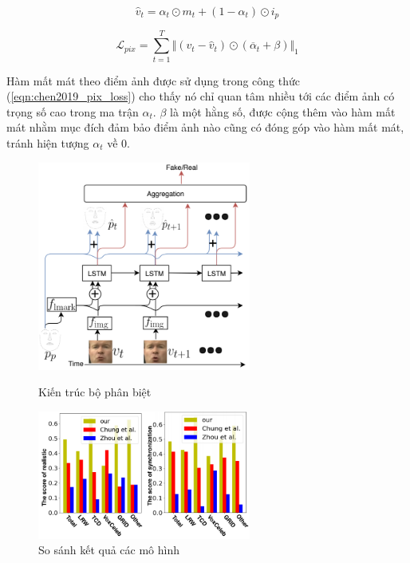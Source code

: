 \begin{equation}
    \hat{v}_t = \alpha_t \odot m_t + (1 - \alpha_t) \odot i_p
\end{equation}

\begin{equation}
    \mathcal{L}_{pix} = \sum^{T}_{t=1} \Vert (v_t - \hat{v}_t) \odot (\overline{\alpha}_t + \beta) \Vert_1
    \label{eqn:chen2019_pix_loss}
\end{equation}

Hàm mất mát theo điểm ảnh được sử dụng trong công thức (\ref{eqn:chen2019_pix_loss}) cho thấy nó chỉ quan tâm nhiều tới các điểm ảnh có trọng số cao trong ma trận $\alpha_t$. $\beta$ là một hằng số, được cộng thêm vào hàm mất mát nhằm mục đích đảm bảo điểm ảnh nào cũng có đóng góp vào hàm mất mát, tránh hiện tượng $\alpha_t$ về 0.

\begin{figure}[H]
    \centering
    \begin{minipage}{0.48\textwidth}
        \includegraphics[width=7cm]{./content/images/chen2019_dis.png}
        \caption{Kiến trúc bộ phân biệt}
        \label{fig:chen2019_dis}
    \end{minipage}\hfill
    \begin{minipage}{0.48\textwidth}
        \includegraphics[width=7cm]{./content/images/chen2019_score.png}
        \caption{So sánh kết quả các mô hình}
        \label{fig:chen2019_score}
    \end{minipage}
\end{figure}

